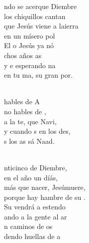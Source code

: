 \documentclass[12pt]{article}
\begin{document}
\begin{multicols*}{2}
\begin{cancion}%
	ndo se acerque Diembre\\
	los chiquillos cantan\\
	que Jesús viene a laierra\\
	en un mísero pol\\
	El o Jesús ya nó\\
	chos años as\\
	y e esperando na\\
	en tu ma, su gran por.\\\jump\\
	\begin{chorus}%
	hables de A\\
	no hables de ,\\
	a la te, que  Navi,\\
	y cuando s en los des,\\
	s los as sá Naad.\\
	\end{chorus}%
	\jump\\
	nticinco de Diembre,\\
	en el año un díás,\\
	más que nacer, Jesúmuere,\\
	porque hay hambre de su .\\
	Su vendrá a estendo\\
	ando a la gente al ar \\
	n caminos de os\\
	dendo huellas de a\\
\end{cancion}%


\end{multicols*}
\end{document}
